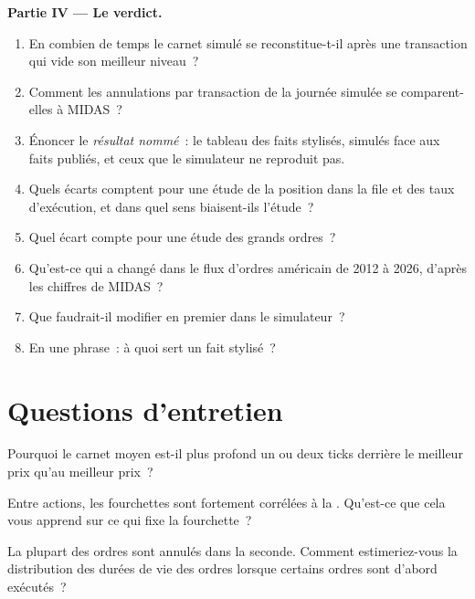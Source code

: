 \begin{problem}
\medskip\noindent\textbf{Partie IV --- Le verdict.}
\begin{enumerate}[resume]
\item En combien de temps le carnet simulé se reconstitue-t-il après une transaction qui vide son meilleur niveau~?
\item Comment les annulations par transaction de la journée simulée se comparent-elles à MIDAS~?
\item Énoncer le \emph{résultat nommé}~: le tableau des faits stylisés, simulés face aux faits publiés, et ceux que le simulateur ne reproduit pas.
\item Quels écarts comptent pour une étude de la position dans la file et des taux d'exécution, et dans quel sens biaisent-ils l'étude~?
\item Quel écart compte pour une étude des grands ordres~?
\item Qu'est-ce qui a changé dans le flux d'ordres américain de 2012 à 2026, d'après les chiffres de MIDAS~?
\item Que faudrait-il modifier en premier dans le simulateur~?
\item En une phrase~: à quoi sert un fait stylisé~?
\end{enumerate}
\end{problem}

\section{Questions d'entretien}

\begin{interviewq}\label{iq:mx:empirical-facts-of-order-books:1}
Pourquoi le carnet moyen est-il plus profond un ou deux ticks derrière le meilleur prix qu'au meilleur prix~?
\end{interviewq}

\begin{interviewq}\label{iq:mx:empirical-facts-of-order-books:2}
Entre actions, les fourchettes sont fortement corrélées à la . Qu'est-ce que cela vous apprend sur ce qui fixe la fourchette~?
\end{interviewq}

\begin{interviewq}\label{iq:mx:empirical-facts-of-order-books:3}
La plupart des ordres sont annulés dans la seconde. Comment estimeriez-vous la distribution des durées de vie des ordres lorsque certains ordres sont d'abord exécutés~?
\end{interviewq}

